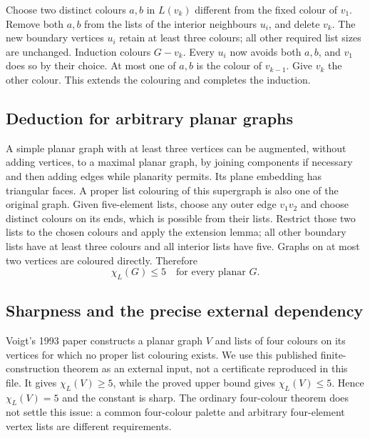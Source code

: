 Choose two distinct colours $a,b$ in $L(v_k)$ different from the fixed colour of $v_1$. Remove both $a,b$ from the lists of the interior neighbours $u_i$, and delete $v_k$. The new boundary vertices $u_i$ retain at least three colours; all other required list sizes are unchanged. Induction colours $G-v_k$. Every $u_i$ now avoids both $a,b$, and $v_1$ does so by their choice. At most one of $a,b$ is the colour of $v_{k-1}$. Give $v_k$ the other colour. This extends the colouring and completes the induction.

\subsection*{Deduction for arbitrary planar graphs}
A simple planar graph with at least three vertices can be augmented, without adding vertices, to a maximal planar graph, by joining components if necessary and then adding edges while planarity permits. Its plane embedding has triangular faces. A proper list colouring of this supergraph is also one of the original graph.
Given five-element lists, choose any outer edge $v_1v_2$ and choose distinct colours on its ends, which is possible from their lists. Restrict those two lists to the chosen colours and apply the extension lemma; all other boundary lists have at least three colours and all interior lists have five. Graphs on at most two vertices are coloured directly. Therefore
\[
 \boxed{\chi_L(G)\le5\quad\text{for every planar }G.}
\]

\subsection*{Sharpness and the precise external dependency}
Voigt's 1993 paper constructs a planar graph $V$ and lists of four colours on its vertices for which no proper list colouring exists. We use this published finite-construction theorem as an external input, not a certificate reproduced in this file. It gives $\chi_L(V)\ge5$, while the proved upper bound gives $\chi_L(V)\le5$. Hence $\chi_L(V)=5$ and the constant is sharp. The ordinary four-colour theorem does not settle this issue: a common four-colour palette and arbitrary four-element vertex lists are different requirements.

